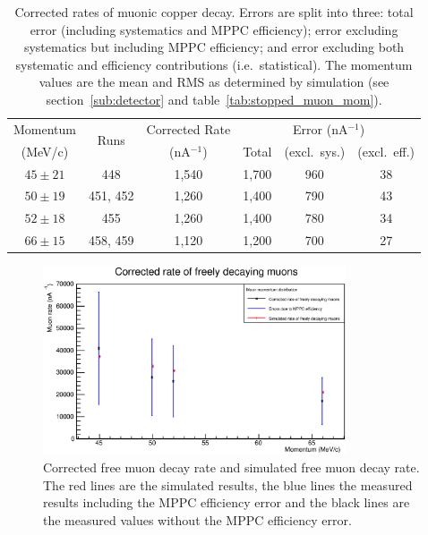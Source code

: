 \begin{table}
  \lineup %
  \begin{center}
  \begin{tabular}{c | c | c | c | c | c}
    Momentum       & \multirow{2}{*}{Runs}  &  Corrected Rate  &  \multicolumn{3}{c}{Error (nA\(^{-1}\))}   \\
     (MeV/c)       &                        &  (nA\(^{-1}\))   &  Total    &  (excl.\ sys.)  &  (excl.\ eff.) \\
    \hline
    \(45 \pm 21\)  &       448              &  1,540           &  1,700    &  960            &  38  \\
    \(50 \pm 19\)  &  451, 452              &  1,260           &  1,400    &  790            &  43  \\
    \(52 \pm 18\)  &       455              &  1,260           &  1,400    &  780            &  34  \\
    \(66 \pm 15\)  &  458, 459              &  1,120           &  1,200    &  700            &  27  \\
  \end{tabular}
  \end{center}
  \caption{Corrected rates of muonic copper decay. Errors are split into three: total error (including systematics and MPPC efficiency); error excluding systematics but including MPPC efficiency; and error excluding both systematic and efficiency contributions (i.e.\ statistical). The momentum values are the mean and RMS as determined by simulation (see section~\ref{sub:detector} and table~\ref{tab:stopped_muon_mom}).}
  \label{tab:adjusted_cu_rates}
\end{table}

\begin{figure}[hptb] 
  \centering
    \includegraphics[width=0.8\textwidth]{images/plot_generating_scripts/adjusted_muon_rates.eps}
  \caption{Corrected free muon decay rate and simulated free muon decay rate. The red lines are the simulated results, the blue lines the measured results including the MPPC efficiency error and the black lines are the measured values without the MPPC efficiency error.}
  \label{fig:images_plot_generating_scripts_adjusted_muon_rates}
\end{figure}

